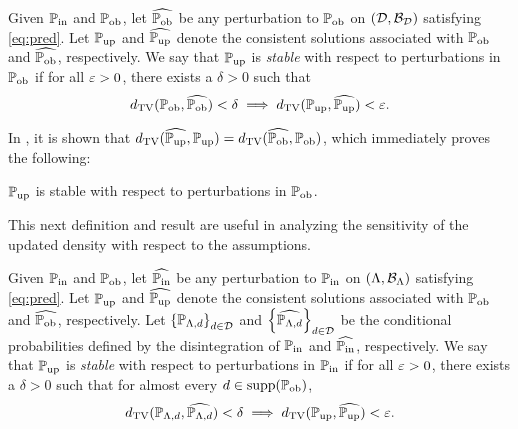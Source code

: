 \begin{defn}\label{defn:stableobs}
Given $\operatorname*{\mathbb{P}_{in}}$ and $\operatorname*{\mathbb{P}_{ob}}$, let $\widehat{\operatorname*{\mathbb{P}_{ob}}}$ be any perturbation to $\operatorname*{\mathbb{P}_{ob}}$ on $(\mathcal{D}, \mathcal{B}_{\mathcal{D}})$ satisfying \eqref{eq:pred}. 
Let $\operatorname*{\mathbb{P}_{up}}$ and $\widehat{\operatorname*{\mathbb{P}_{up}}}$ denote the consistent solutions associated with $\operatorname*{\mathbb{P}_{ob}}$ and $\widehat{\operatorname*{\mathbb{P}_{ob}}}$, respectively. 
We say that $\operatorname*{\mathbb{P}_{up}}$ is \emph{stable} with respect to perturbations in $\operatorname*{\mathbb{P}_{ob}}$ if for all $\varepsilon > 0$, there exists a $\delta > 0$ such that
\begin{equation}
d_{\text{TV}} (\operatorname*{\mathbb{P}_{ob}}, \widehat{\operatorname*{\mathbb{P}_{ob}}}) < \delta \implies d_{\text{TV}} (\operatorname*{\mathbb{P}_{up}}, \widehat{\operatorname*{\mathbb{P}_{up}}}) < \varepsilon.
\end{equation}
\end{defn}

In \cite{BJW18}, it is shown that $d_{\text{TV}} (\widehat{\operatorname*{\mathbb{P}_{up}}}, \operatorname*{\mathbb{P}_{up}}) = d_{\text{TV}} (\widehat{\operatorname*{\mathbb{P}_{ob}}}, \operatorname*{\mathbb{P}_{ob}})$, which immediately proves the following:

\begin{thm}
$\operatorname*{\mathbb{P}_{up}}$ is stable with respect to perturbations in $\operatorname*{\mathbb{P}_{ob}}$.
\label{thm:stableobs}
\end{thm}

This next definition and result are useful in analyzing the sensitivity of the updated density with respect to the assumptions.

\begin{defn}\label{defn:stableprior}
Given $\operatorname*{\mathbb{P}_{in}}$ and $\operatorname*{\mathbb{P}_{ob}}$, let $\widehat{\operatorname*{\mathbb{P}_{in}}}$ be any perturbation to $\operatorname*{\mathbb{P}_{in}}$ on $({\Lambda}, \mathcal{B}_{{\Lambda}})$ satisfying \eqref{eq:pred}. 
Let $\operatorname*{\mathbb{P}_{up}}$ and $\widehat{\operatorname*{\mathbb{P}_{up}}}$ denote the consistent solutions associated with $\operatorname*{\mathbb{P}_{ob}}$ and $\widehat{\operatorname*{\mathbb{P}_{ob}}}$, respectively. 
Let $\left\{\mathbb{P}_{{\Lambda}, d}\right\}_{d\in\mathcal{D}}^{}$ and $\left\{\widehat{\mathbb{P}_{{\Lambda}, d}}\right\}_{d\in\mathcal{D}}^{}$ be the conditional probabilities defined by the disintegration of $\operatorname*{\mathbb{P}_{in}}$ and $\widehat{\operatorname*{\mathbb{P}_{in}}}$, respectively. 
We say that $\operatorname*{\mathbb{P}_{up}}$ is \emph{stable} with respect to perturbations in $\operatorname*{\mathbb{P}_{in}}$ if for all $\varepsilon > 0$, there exists a $\delta > 0$ such that for almost every $d\in\text{supp}(\operatorname*{\mathbb{P}_{ob}})$, 
\begin{equation}\label{eq:stableprior}
d_{\text{TV}} (\mathbb{P}_{{\Lambda}, d}, \widehat{\mathbb{P}_{{\Lambda}, d}}) < \delta \implies d_{\text{TV}} (\operatorname*{\mathbb{P}_{up}}, \widehat{\operatorname*{\mathbb{P}_{up}}}) < \varepsilon.
\end{equation}
\end{defn}

